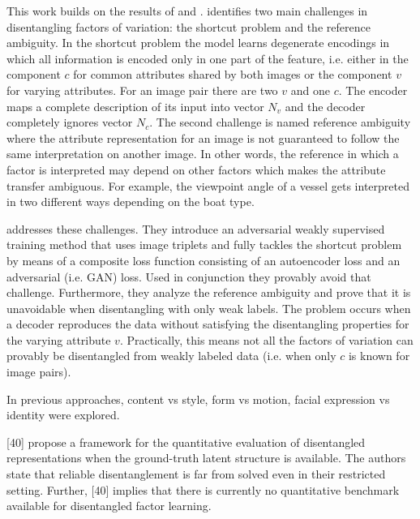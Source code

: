 \documentclass[11pt,a4paper]{article}
\begin{document}
This work builds on the results of \cite{1711.07410} and \cite{1711.02245}.
\cite{1711.02245} identifies two main challenges in disentangling factors of variation: the shortcut problem and the reference ambiguity. In the shortcut problem the model learns degenerate encodings in which all information is encoded only in one part of the feature, i.e. either in the component $c$ for common attributes shared by both images or the component $v$ for varying attributes. For an image pair there are two $v$ and one $c$. The encoder maps a complete description of its input into vector $N_v$ and the decoder completely ignores vector $N_c$.
\newline The second challenge is named reference ambiguity where the attribute representation for an image is not guaranteed to follow the same interpretation on another image. In other words, the reference in which a factor is interpreted may depend on other factors which makes the attribute transfer ambiguous. For example, the viewpoint angle of a vessel gets interpreted in two different ways depending on the boat type.
\par[Understanding Degeneracies and Ambiguities in Attribute Transfer] addresses these challenges. They introduce an adversarial weakly supervised training method that uses image triplets and fully tackles the shortcut problem by means of a composite loss function consisting of an autoencoder loss and an adversarial (i.e. GAN) loss. Used in conjunction they provably avoid that challenge. 
Furthermore, they analyze the reference ambiguity and prove that it is unavoidable when disentangling with only weak labels. The problem occurs when a decoder reproduces the data without satisfying the disentangling properties for the varying attribute $v$. Practically, this means not all the factors of variation can provably be disentangled from weakly labeled data (i.e. when only $c$ is known for image pairs).    

In previous approaches, content vs style, form vs motion, facial expression vs identity were explored.

[40] propose a framework for the quantitative evaluation of disentangled representations when the ground-truth latent structure is available. The authors state that reliable disentanglement is far from solved even in their restricted setting. Further, [40] implies that there is currently no quantitative benchmark available for disentangled factor learning.
\end{document}
